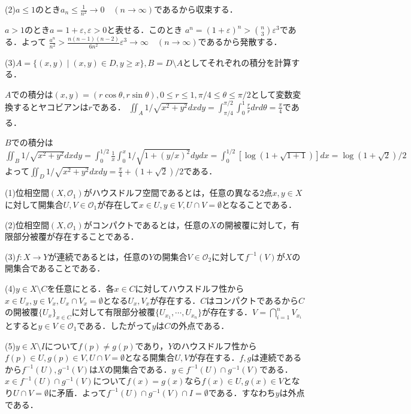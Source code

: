 \documentclass[
		book,
		head_space=20mm,
		foot_space=20mm,
		gutter=10mm,
		line_length=190mm
]{jlreq}
\begin{document}
(2)$a\le 1$のとき$a_n\le \frac{1}{n^2}\rightarrow 0\quad (n\rightarrow \infty)$であるから収束する．

$a>1$のとき$a=1+\varepsilon,\varepsilon>0$と表せる．このとき
$a^n=(1+\varepsilon)^n>\binom{n}{3}\varepsilon^3$である．よって
$\frac{a^n}{n^2}>\frac{n(n-1)(n-2)}{6n^2}\varepsilon^3\rightarrow \infty\quad (n\rightarrow \infty)$であるから発散する．

(3)$A=\{ (x,y) \mid (x,y)\in D,y\ge x\},B=D\setminus A$としてそれぞれの積分を計算する．

$A$での積分は$(x,y)=(r\cos \theta,r\sin \theta),0\le r\le 1,\pi/4\le \theta\le\pi/2$として変数変換するとヤコビアンは$r$である．
$\iint_A 1/\sqrt{x^2+y^2}dxdy=\int_{\pi/4}^{\pi/2}\int_0^1\frac{r}{r}drd\theta=\frac{\pi}{4}$である．

$B$での積分は
$\iint_B 1/\sqrt{x^2+y^2}dxdy=\int_0^{1/2}\frac{1}{x}\int_0^x 1/\sqrt{1+(y/x)^2}dydx=\int_0^{1/2}\left[ \log (1+ \sqrt{1+1})\right]dx=\log(1+\sqrt{2})/2$
よって$\iint_D 1/\sqrt{x^2+y^2}dxdy=\frac{\pi}{4}+(1+\sqrt{2})/2$である．

(1)位相空間$(X,\mathcal{O}_1)$がハウスドルフ空間であるとは，任意の異なる$2$点$x,y\in X$に対して開集合$U,V\in \mathcal{O}_1$が存在して$x\in U,y\in V,U\cap V=\emptyset$となることである．

(2)位相空間$(X,\mathcal{O}_1)$がコンパクトであるとは，任意の$X$の開被覆に対して，有限部分被覆が存在することである．

(3)$f \colon X \rightarrow Y$が連続であるとは，任意の$Y$の開集合$V\in \mathcal{O}_2$に対して$f^{-1}(V)$が$X$の開集合であることである．

(4)$y \in X \setminus C$を任意にとる．各$x \in C$に対してハウスドルフ性から$x \in U_x,y \in V_x,U_x \cap V_x=\emptyset$となる$U_x,V_x$が存在する．$C$はコンパクトであるから$C$の開被覆$\{U_x\}_{x\in C}$に対して有限部分被覆$\{U_{x_1},\cdots,U_{x_n}\}$が存在する．$V=\bigcap_{i=1}^n V_{x_i}$とすると$y \in V\in \mathcal{O}_1$である．したがって$y$は$C$の外点である．

(5)$y \in X \setminus I$について$f(p)\neq g(p)$であり，$Y$のハウスドルフ性から$f(p)\in U, g(p)\in V, U\cap V=\emptyset$となる開集合$U,V$が存在する．$f,g$は連続であるから$f^{-1}(U),g^{-1}(V)$は$X$の開集合である．$y \in f^{-1}(U)\cap g^{-1}(V)$である．$x \in f^{-1}(U)\cap g^{-1}(V)$について$f(x)=g(x)$なら$f(x)\in U,g(x)\in V$となり$U \cap V=\emptyset$に矛盾．よって$f^{-1}(U)\cap g^{-1}(V) \cap I=\emptyset$である．すなわち$y$は外点である．
\end{document}
